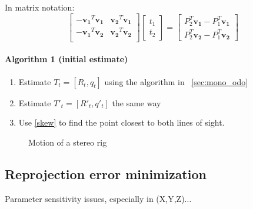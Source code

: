 \documentclass[10pt]{article}         %
\begin{document}
In matrix notation:
\[
\begin{bmatrix}
-\mathbf{v_1}^T\mathbf{v_1} & \mathbf{v_2}^T\mathbf{v_1} \\
-\mathbf{v_1}^T\mathbf{v_2} & \mathbf{v_2}^T\mathbf{v_2} \\
\end{bmatrix}
\begin{bmatrix}
t_1 \\ t_2 
\end{bmatrix}=
\begin{bmatrix}
P_2^T\mathbf{v_1}-P_1^T\mathbf{v_1} \\ P_2^T\mathbf{v_2}-P_1^T\mathbf{v_2} 
\end{bmatrix}
\]

\paragraph{Algorithm 1 (initial estimate)}
\begin{enumerate}
\item Estimate $T_t=[R_t,q_t]$ using the algorithm in ~\ref{sec:mono_odo}
\item Estimate $T'_t=[R'_t,q'_t]$ the same way
\item Use \ref{skew} to find the point closest to both lines of sight.
\end{enumerate}

\begin{figure}[!h]
  \centering
  \caption{Motion of a stereo rig}
  \label{fig:stereo_rig}
\end{figure}

\subsection{Reprojection error minimization}
Parameter sensitivity issues, especially in (X,Y,Z)...
\end{document}
